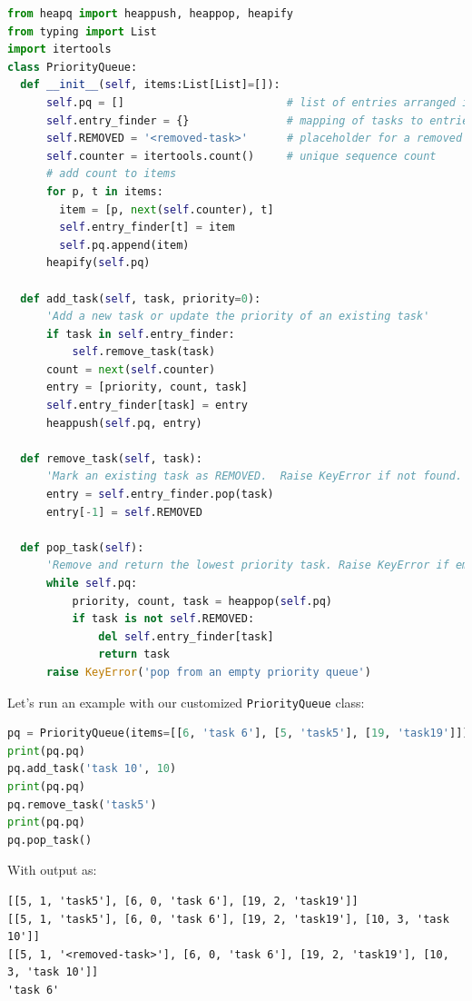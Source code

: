 \documentclass[main.tex]{subfiles}
\begin{document}
\begin{lstlisting}[language=Python]
from heapq import heappush, heappop, heapify
from typing import List
import itertools
class PriorityQueue:
  def __init__(self, items:List[List]=[]):
      self.pq = []                         # list of entries arranged in a heap
      self.entry_finder = {}               # mapping of tasks to entries
      self.REMOVED = '<removed-task>'      # placeholder for a removed task
      self.counter = itertools.count()     # unique sequence count
      # add count to items
      for p, t in items:
        item = [p, next(self.counter), t]
        self.entry_finder[t] = item
        self.pq.append(item)
      heapify(self.pq)
        
  def add_task(self, task, priority=0):
      'Add a new task or update the priority of an existing task'
      if task in self.entry_finder:
          self.remove_task(task)
      count = next(self.counter)
      entry = [priority, count, task]
      self.entry_finder[task] = entry
      heappush(self.pq, entry)
      
  def remove_task(self, task):
      'Mark an existing task as REMOVED.  Raise KeyError if not found.'
      entry = self.entry_finder.pop(task)
      entry[-1] = self.REMOVED

  def pop_task(self):
      'Remove and return the lowest priority task. Raise KeyError if empty.'
      while self.pq:
          priority, count, task = heappop(self.pq)
          if task is not self.REMOVED:
              del self.entry_finder[task]
              return task
      raise KeyError('pop from an empty priority queue')
\end{lstlisting}
Let's run an example with our customized \texttt{PriorityQueue} class:
\begin{lstlisting}[language=Python]
pq = PriorityQueue(items=[[6, 'task 6'], [5, 'task5'], [19, 'task19']])
print(pq.pq)
pq.add_task('task 10', 10)
print(pq.pq)
pq.remove_task('task5')
print(pq.pq)
pq.pop_task()
\end{lstlisting}
With output as:
\begin{lstlisting}[numbers=none]
[[5, 1, 'task5'], [6, 0, 'task 6'], [19, 2, 'task19']]
[[5, 1, 'task5'], [6, 0, 'task 6'], [19, 2, 'task19'], [10, 3, 'task 10']]
[[5, 1, '<removed-task>'], [6, 0, 'task 6'], [19, 2, 'task19'], [10, 3, 'task 10']]
'task 6'
\end{lstlisting}
\end{document}
